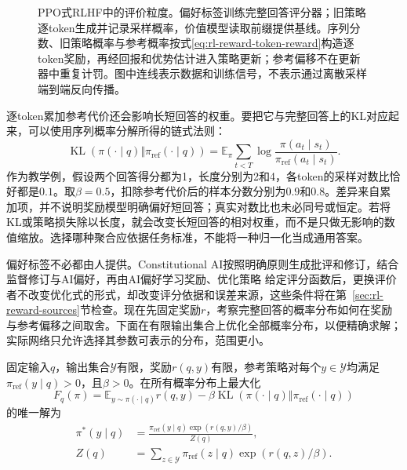 \begin{figure}[htbp]
  \centering
  
  \caption{PPO式RLHF中的评价粒度。偏好标签训练完整回答评分器；旧策略逐token生成并记录采样概率，价值模型读取前缀提供基线。序列分数、旧策略概率与参考概率按式\eqref{eq:rl-reward-token-reward}构造逐token奖励，再经回报和优势估计进入策略更新；参考偏移不在更新器中重复计罚。图中连线表示数据和训练信号，不表示通过离散采样端到端反向传播。}
  \label{fig:rl-reward-rlhf}
\end{figure}

逐token累加参考代价还会影响长短回答的权重。要把它与完整回答上的KL对应起来，可以使用序列概率分解所得的链式法则：
\[
  \operatorname{KL}(\pi(\cdot\mid q)\Vert\pi_{\mathrm{ref}}(\cdot\mid q))
  =\mathbb E_\pi\sum_{t<T}
    \log\frac{\pi(a_t\mid s_t)}{\pi_{\mathrm{ref}}(a_t\mid s_t)}.
\]
作为教学例，假设两个回答得分都为1，长度分别为2和4，各token的采样对数比恰好都是$0.1$。取$\beta=0.5$，扣除参考代价后的样本分数分别为$0.9$和$0.8$。差异来自累加项，并不说明奖励模型明确偏好短回答；真实对数比也未必同号或恒定。若将KL或策略损失除以长度，就会改变长短回答的相对权重，而不是只做无影响的数值缩放。选择哪种聚合应依据任务标准，不能将一种归一化当成通用答案。

偏好标签不必都由人提供。Constitutional AI按照明确原则生成批评和修订，结合监督修订与AI偏好，再由AI偏好学习奖励、优化策略
给定评分函数后，更换评价者不改变优化式的形式，却改变评分依据和误差来源，这些条件将在第~\ref{sec:rl-reward-sources}节检查。现在先固定奖励$r$，考察完整回答的概率分布如何在奖励与参考偏移之间取舍。下面在有限输出集合上优化全部概率分布，以便精确求解；实际网络只允许选择其参数可表示的分布，范围更小。

\begin{theorem}[KL正则化奖励最大化的最优策略]
  \label{thm:rl-reward-kl}
  固定输入$q$，输出集合$\mathcal Y$有限，奖励$r(q,y)$有限，参考策略对每个$y\in\mathcal Y$均满足$\pi_{\mathrm{ref}}(y\mid q)>0$，且$\beta>0$。在所有概率分布上最大化
  \[
    F_q(\pi)=\mathbb E_{y\sim\pi(\cdot\mid q)}r(q,y)
     -\beta\operatorname{KL}(\pi(\cdot\mid q)\Vert
                                      \pi_{\mathrm{ref}}(\cdot\mid q))
  \]
  的唯一解为
  \begin{equation}
    \begin{aligned}
      \pi^*(y\mid q)&=
        \frac{\pi_{\mathrm{ref}}(y\mid q)\exp(r(q,y)/\beta)}{Z(q)},\\
      Z(q)&=\sum_{z\in\mathcal Y}\pi_{\mathrm{ref}}(z\mid q)
                                \exp(r(q,z)/\beta).
    \end{aligned}
    \label{eq:rl-reward-kl-optimum}
  \end{equation}
\end{theorem}

